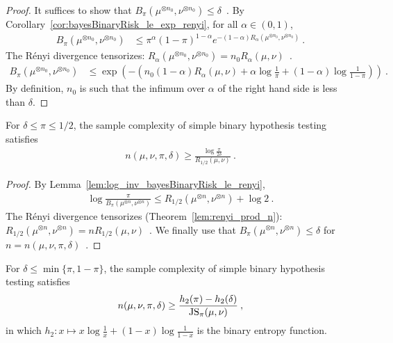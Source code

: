 \begin{proof}%
{}
It suffices to show that $B_\pi(\mu^{\otimes n_0}, \nu^{\otimes n_0}) \le \delta$~.
By Corollary~\ref{cor:bayesBinaryRisk_le_exp_renyi}, for all $\alpha \in (0,1)$,
\begin{align*}
B_\pi(\mu^{\otimes n_0}, \nu^{\otimes n_0})
&\le \pi^{\alpha} (1 - \pi)^{1 - \alpha}e^{- (1 - \alpha)R_\alpha(\mu^{\otimes n_0}, \nu^{\otimes n_0})}
\: .
\end{align*}
The Rényi divergence tensorizes: $R_\alpha(\mu^{\otimes n_0}, \nu^{\otimes n_0}) = n_0 R_\alpha(\mu, \nu)$~.
\begin{align*}
B_\pi(\mu^{\otimes n_0}, \nu^{\otimes n_0})
&\le \exp\left(- \left( n_0 (1 - \alpha)R_\alpha(\mu, \nu) + \alpha\log\frac{1}{\pi} + (1 - \alpha)\log\frac{1}{1 - \pi} \right) \right)
\: .
\end{align*}
By definition, $n_0$ is such that the infimum over $\alpha$ of the right hand side is less than $\delta$.
\end{proof}


\begin{lemma}
  \label{lem:binaryPriorSampleComplexity_ge_renyi}
  For $\delta \le \pi \le 1/2$, the sample complexity of simple binary hypothesis testing satisfies
  \begin{align*}
  n(\mu, \nu, \pi, \delta) \ge \frac{\log\frac{\pi}{2\delta}}{R_{1/2}(\mu, \nu)}
  \: .
  \end{align*}
\end{lemma}

\begin{proof}%
{}
By Lemma~\ref{lem:log_inv_bayesBinaryRisk_le_renyi},
\begin{align*}
\log\frac{\pi}{B_\pi(\mu^{\otimes n}, \nu^{\otimes n})} \le R_{1/2}(\mu^{\otimes n}, \nu^{\otimes n}) + \log 2
\: .
\end{align*}
The Rényi divergence tensorizes (Theorem~\ref{lem:renyi_prod_n}): $R_{1/2}(\mu^{\otimes n}, \nu^{\otimes n}) = n R_{1/2}(\mu, \nu)$~.
We finally use that $B_\pi(\mu^{\otimes n}, \nu^{\otimes n}) \le \delta$ for $n = n(\mu, \nu, \pi, \delta)$~.
\end{proof}


\begin{lemma}
  \label{lem:binaryPriorSampleComplexity_ge_jensenShannon}
  For $\delta \le \min\{\pi, 1 - \pi\}$, the sample complexity of simple binary hypothesis testing satisfies
  \begin{align*}
  n(\mu, \nu, \pi, \delta) \ge \frac{h_2(\pi) - h_2(\delta)}{\operatorname{JS}_\pi(\mu, \nu)}
  \: ,
  \end{align*}
  in which $h_2: x \mapsto x\log\frac{1}{x} + (1 - x)\log\frac{1}{1 - x}$ is the binary entropy function.
\end{lemma}

